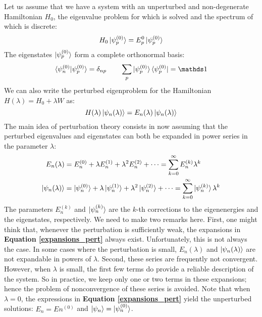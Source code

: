 Let us assume that we have a system with an unperturbed and non-degenerate Hamiltonian $H_0$, the eigenvalue problem for which is solved and the spectrum of which is discrete:
\begin{equation}
    H_0 \ket{\psi_p^{(0)}} = E_p^0\ket{\psi_p^{(0)}}
\end{equation}
The eigenstates $\ket{\psi_p^{(0)}}$ form a complete orthonormal basis:
\begin{equation}
    \braket{\psi_n^{(0)}|\psi_p^{(0)}} = \delta_{np} \qquad \sum_p \ket{\psi_p^{(0)}}\bra{\psi_p^{(0)}} = \Imat
\end{equation}
We can also write the perturbed eigenproblem for the Hamiltonian $H(\lambda) = H_0 + \lambda W$ as:
\begin{equation}
    H(\lambda)\ket{\psi_n(\lambda)} = E_n(\lambda)\ket{\psi_n(\lambda)}
\end{equation}
The main idea of perturbation theory consists in now assuming that the perturbed eigenvalues and eigenstates can both be expanded in power series in the parameter $\lambda$:
\begin{equation} \label{expansions_pert}
    \begin{split}
        E_n(\lambda) &= E_n^{(0)} + \lambda E_n^{(1)} + \lambda^2 E_n^{(2)} + \cdots = \sum_{k=0}^\infty E_n^{(k)}\lambda^k\\
        \ket{\psi_n(\lambda)} &= \ket{\psi_n^{(0)}} + \lambda \ket{\psi_n^{(1)}} + \lambda^2\ket{\psi_n^{(2)}} + \cdots = \sum_{k=0}^\infty \ket{\psi_n^{(k)}}\lambda^k
    \end{split}
\end{equation}
The parameters $E_n^{(k)}$ and $\ket{\psi_n^{(k)}}$ are the $k$-th corrections to the eigenenergies and the eigenstates, respectively. We need to make two remarks here. First, one might think that, whenever the perturbation is sufficiently weak, the expansions in \textbf{Equation \ref{expansions_pert}} always exist. Unfortunately, this is not always the case. In some cases where the perturbation is small, $E_n(\lambda)$ and $\ket{\psi_n(\lambda)}$ are not expandable in powers of $\lambda$. Second, these series are frequently not convergent. However, when $\lambda$ is small, the first few terms do provide a reliable description of the system. So in practice, we keep only one or two terms in these expansions; hence the problem of nonconvergence of these series is avoided. Note that when $\lambda=0$, the expressions in \textbf{Equation \ref{expansions_pert}} yield the unperturbed solutions: $E_n = E n^{(0)}$ and $\ket{\psi_n} = \ket{\psi_n^{(0)}}$.

